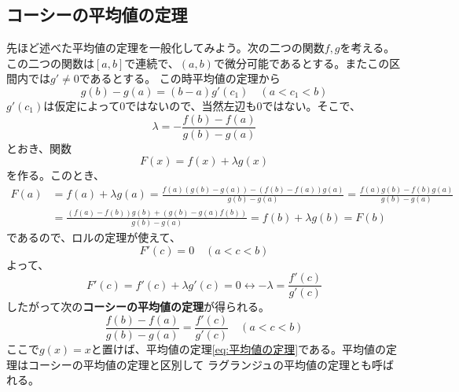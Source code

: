 \documentclass[a4j,dvipdfmx]{jsarticle}
\begin{document}
                \subsection{コーシーの平均値の定理}
                    先ほど述べた平均値の定理を一般化してみよう。次の二つの関数$f,g$を考える。
                    この二つの関数は$[a,b]$で連続で、$(a,b)$で微分可能であるとする。またこの区間内では$g'\neq 0$であるとする。
                    この時平均値の定理から
                    \begin{equation*}
                        g(b)-g(a)=(b-a)g'(c_1)\quad(a<c_1<b)
                    \end{equation*}
                    $g'(c_1)$は仮定によって$0$ではないので、当然左辺も$0$ではない。そこで、
                    \begin{equation*}
                        \lambda=-\frac{f(b)-f(a)}{g(b)-g(a)}
                    \end{equation*}
                    とおき、関数
                    \begin{equation*}
                        F(x)=f(x)+\lambda g(x)
                    \end{equation*}
                    を作る。このとき、
                    \begin{align*}
                        F(a)&=f(a)+\lambda g(a)=\frac{f(a)(g(b)-g(a))-(f(b)-f(a))g(a)}{g(b)-g(a)}=\frac{f(a)g(b)-f(b)g(a)}{g(b)-g(a)}\\
                        &=\frac{(f(a)-f(b))g(b)+(g(b)-g(a)f(b))}{g(b)-g(a)}=f(b)+\lambda g(b)=F(b)
                    \end{align*}
                    であるので、ロルの定理が使えて、
                    \begin{equation*}
                        F'(c)=0\quad(a<c<b)
                    \end{equation*}
                    よって、
                    \begin{equation*}
                        F'(c)=f'(c)+\lambda g'(c)=0\leftrightarrow -\lambda = \frac{f'(c)}{g'(c)}
                    \end{equation*}
                    したがって次の\textbf{コーシーの平均値の定理}が得られる。
                    \begin{equation}
                        \frac{f(b)-f(a)}{g(b)-g(a)}=\frac{f'(c)}{g'(c)}\quad(a<c<b)\label{eq:コーシーの平均値の定理}
                    \end{equation}
                    ここで$g(x)=x$と置けば、平均値の定理\ref{eq:平均値の定理}である。平均値の定理はコーシーの平均値の定理と区別して
                    ラグランジュの平均値の定理とも呼ばれる。
    
\end{document}
